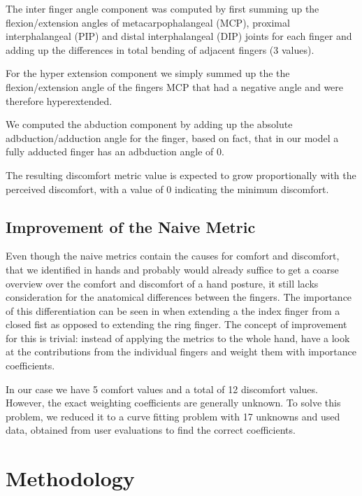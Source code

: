 \documentclass{sig-alternate-05-2015}
\begin{document}
The inter finger angle component was computed by first summing up the flexion/extension angles of metacarpophalangeal (MCP), proximal interphalangeal (PIP) and distal interphalangeal (DIP) joints for each finger and adding up the differences in total bending of adjacent fingers (3 values). 

For the hyper extension component we simply summed up the the flexion/extension angle of the fingers MCP that had a negative angle and were therefore hyperextended.

We computed the abduction component by adding up the absolute adbduction/adduction angle for the finger, based on fact, that in our model a fully adducted finger has an adbduction angle of 0.

The resulting discomfort metric value is expected to grow proportionally with the perceived discomfort, with a value of 0 indicating the minimum discomfort. 

\subsection{Improvement of the Naive Metric}

Even though the naive metrics contain the causes for comfort and discomfort, that we identified in hands and probably would already suffice to get a coarse overview over the comfort and discomfort of a hand posture, it still lacks consideration for the anatomical differences between the fingers. The importance of this differentiation can be seen in when extending a the index finger from a closed fist as opposed to extending the ring finger. 
The concept of improvement for this is trivial: instead of applying the metrics to the whole hand, have a look at the contributions from the individual fingers and weight them with importance coefficients. 

In our case we have 5 comfort values and a total of 12 discomfort values. However, the exact weighting coefficients are generally unknown. To solve this problem, we reduced it to a curve fitting problem with 17 unknowns and used data, obtained from user evaluations to find the correct coefficients.

\section{Methodology}
\end{document}
